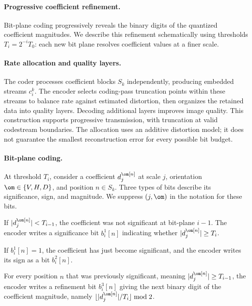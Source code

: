 \paragraph{Progressive coefficient refinement.}

Bit-plane coding progressively reveals the binary digits of the quantized coefficient magnitudes. We describe this refinement schematically using thresholds $T_i = 2^{-i}T_0$: each new bit plane resolves coefficient values at a finer scale.

\paragraph{Rate allocation and quality layers.}
The coder processes coefficient blocks $S_k$ independently, producing embedded streams $c_i^k$. The encoder selects coding-pass truncation points within these streams to balance rate against estimated distortion, then organizes the retained data into quality layers. Decoding additional layers improves image quality. This construction supports progressive transmission, with truncation at valid codestream boundaries. The allocation uses an additive distortion model; it does not guarantee the smallest reconstruction error for every possible bit budget.

\paragraph{Bit-plane coding.}

At threshold $T_i$, consider a coefficient $d_j^\om[n]$ at scale $j$, orientation $\om\in\{V,H,D\}$, and position $n\in S_k$. Three types of bits describe its significance, sign, and magnitude. We suppress $(j,\om)$ in the notation for these bits.
\begin{rs}
	\item If $|d_j^\om[n]|<T_{i-1}$, the coefficient was not significant at bit-plane $i-1$. The encoder writes a significance bit
		$b_i^1[n]$ indicating whether $|d_j^\om[n]|\geq T_i$.
	\item If $b_i^1[n]=1$, the coefficient has just become significant, and the encoder writes its sign as a bit $b_i^2[n]$.
	\item For every position $n$ that was previously significant, meaning $|d_j^\om[n]|\geq T_{i-1}$, the encoder writes a refinement bit
		 $b_i^3[n]$ giving the next binary digit of the coefficient magnitude, namely $\lfloor|d_j^\om[n]|/T_i\rfloor\bmod2$.
\end{rs}

